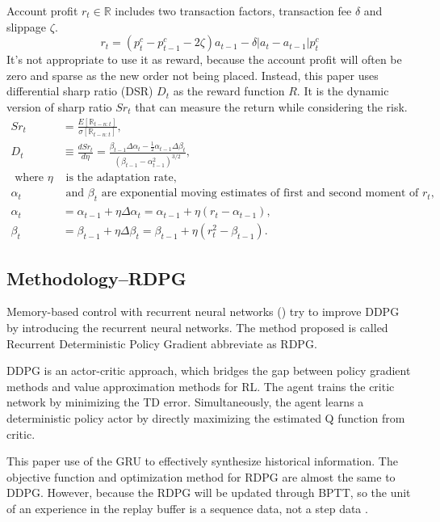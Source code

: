 \begin{itemize}
Account profit $r_t \in \mathbb{R}$ includes two transaction factors, transaction fee $\delta$ and slippage $\zeta$.
$$
r_t = (p_t^c-p_{t-1}^c-2\zeta)a_{t-1} - \delta|a_t-a_{t-1}|p_t^c
$$
It's not appropriate to use it as reward, because the account profit will often be zero and sparse as the new order not being placed. Instead, this paper uses differential sharp ratio (DSR) $D_t$ as the reward function $R$. It is the dynamic version of sharp ratio $Sr_t$ that can measure the return while considering the risk.
$$
\begin{aligned}
Sr_t &= \frac{E[\mathbb{R}_{t-n:t}]}{\sigma [\mathbb{R}_{t-n:t}]},\\
D_t
&\equiv \frac{dSr_t}{d\eta}
=\frac{\beta_{t-1}\Delta \alpha_t-\frac{1}{2}\alpha_{t-1}\Delta \beta_t}{(\beta_{t-1}-\alpha^2_{t-1})^{3/2}},\\
\text{ where } \eta& \text{ is the adaptation rate},\\
\alpha_t &\text{ and $\beta_t$} \text{ are exponential moving estimates of first and second moment of $r_t$,}\\ \alpha_t &= \alpha_{t-1} + \eta \Delta \alpha_t = \alpha_{t-1}+\eta(r_t-\alpha_{t-1}),\\
\beta_t &= \beta_{t-1}+\eta \Delta \beta_t = \beta_{t-1} + \eta(r^2_t - \beta_{t-1}).
\end{aligned}
$$
\end{itemize}


\subsection{Methodology--RDPG}
Memory-based control with recurrent neural networks (\cite{heess2015memory}) try to improve DDPG by introducing the recurrent neural networks. The method proposed is called Recurrent Deterministic Policy Gradient abbreviate as RDPG.

DDPG is an actor-critic approach, which bridges the gap between policy gradient methods and value approximation methods for RL.
The agent trains the critic network by minimizing the TD error.
Simultaneously, the agent learns a deterministic policy actor by directly maximizing the estimated Q function from critic.

This paper use of the GRU to effectively synthesize historical information.
The objective function and optimization method for RDPG are almost the same to DDPG. 
However, because the RDPG will be updated through BPTT, so the unit of an experience in the replay buffer is a sequence data, not a step data .

